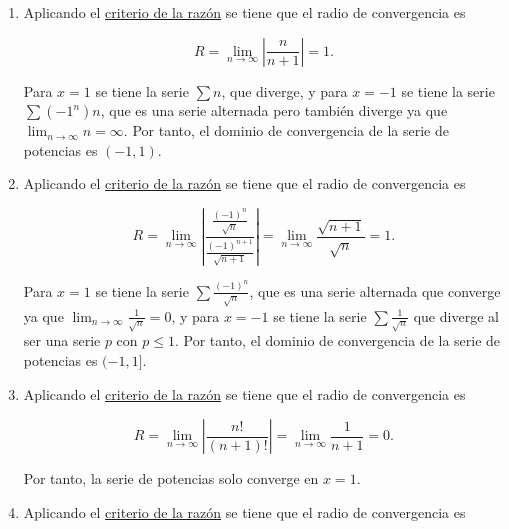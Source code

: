 \documentclass[
  spanish,
  a4paper,
]{scrreport}
\theoremstyle{definition}
\theoremstyle{remark}
\begin{document}
\begin{tcolorbox}[enhanced jigsaw, arc=.35mm, bottomrule=.15mm, bottomtitle=1mm, breakable, colback=white, colbacktitle=quarto-callout-tip-color!10!white, colframe=quarto-callout-tip-color-frame, coltitle=black, left=2mm, leftrule=.75mm, opacityback=0, opacitybacktitle=0.6, rightrule=.15mm, title=\textcolor{quarto-callout-tip-color}{\faLightbulb}\hspace{0.5em}{Solución}, titlerule=0mm, toprule=.15mm, toptitle=1mm]

\begin{enumerate}
\def\labelenumi{\alph{enumi}.}
\item
  Aplicando el
  \href{https://aprendeconalf.es/analisis-manual/08-series.html\#thm-radio-convergencia-raiz}{criterio
  de la razón} se tiene que el radio de convergencia es

  \[
   R = \lim_{n\to\infty} \left|\frac{n}{n+1}\right| = 1.
   \]

  Para \(x=1\) se tiene la serie \(\sum n\), que diverge, y para
  \(x=-1\) se tiene la serie \(\sum (-1^n)n\), que es una serie
  alternada pero también diverge ya que \(\lim_{n\to\infty} n
   =\infty\). Por tanto, el dominio de convergencia de la serie de
  potencias es \((-1,1)\).
\item
  Aplicando el
  \href{https://aprendeconalf.es/analisis-manual/08-series.html\#thm-radio-convergencia-raiz}{criterio
  de la razón} se tiene que el radio de convergencia es

  \[
   R = \lim_{n\to\infty} \left|\frac{\frac{(-1)^n}{\sqrt{n}}}{\frac{(-1)^{n+1}}{\sqrt{n+1}}}\right| = \lim_{n\to\infty} \frac{\sqrt{n+1}}{\sqrt{n}} = 1.
   \]

  Para \(x=1\) se tiene la serie \(\sum \frac{(-1)^n}{\sqrt{n}}\), que
  es una serie alternada que converge ya que
  \(\lim_{n\to\infty} \frac{1}{\sqrt{n}} = 0\), y para \(x=-1\) se tiene
  la serie \(\sum \frac{1}{\sqrt{n}}\) que diverge al ser una serie
  \(p\) con \(p\leq 1\). Por tanto, el dominio de convergencia de la
  serie de potencias es \((-1,1]\).
\item
  Aplicando el
  \href{https://aprendeconalf.es/analisis-manual/08-series.html\#thm-radio-convergencia-raiz}{criterio
  de la razón} se tiene que el radio de convergencia es

  \[
   R = \lim_{n\to\infty} \left|\frac{n!}{(n+1)!}\right| = \lim_{n\to\infty} \frac{1}{n+1} = 0.
   \]

  Por tanto, la serie de potencias solo converge en \(x=1\).
\item
  Aplicando el
  \href{https://aprendeconalf.es/analisis-manual/08-series.html\#thm-radio-convergencia-raiz}{criterio
  de la razón} se tiene que el radio de convergencia es


\end{enumerate}
\end{tcolorbox}
\end{document}
